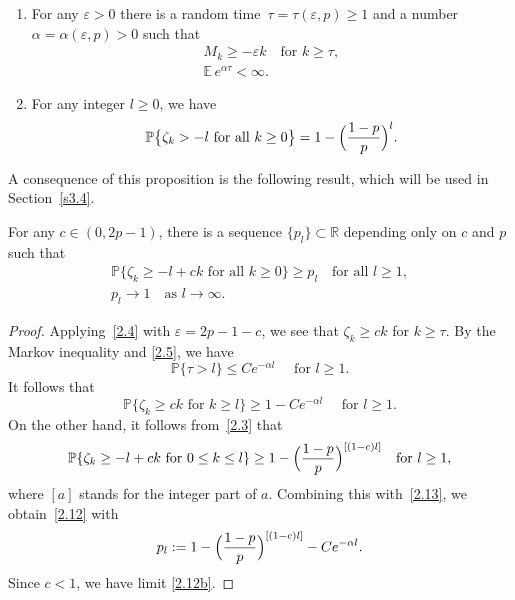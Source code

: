 \documentclass[JEP,XML,SOM,Unicode,ThmDefs]{cedram}
\newenvironment{enumeratea}
{\bgroup\def\theenumi{\alph{enumi}}\begin{enumerate}}
{\end{enumerate}\egroup}
\theoremstyle{plain}
\numberwithin{equation}{section}
\let\e\varepsilon
\let\ty\infty
\newcommand{\R}{{\mathbb R}}
\newcommand{\IP}{{\mathbb P}}
\newcommand{\E}{{\mathbb E}}
\begin{document}
\skpt
\begin{proposition} \label{p2.1}
\begin{enumeratea}
\item
For any $\e\!>\!0$ there is a random time~$\tau\!=\!\tau(\e,p)\!\ge\!1$ and a number \hbox{$\alpha\!=\!\alpha(\e,p)\!>\!0$} such that
\begin{gather}
M_k\ge -\e k\quad\text{for $k\ge\tau$},\label{2.4}\\
\E \,e^{\alpha\tau}<\infty. \label{2.5}
\end{gather}

\item
For any integer $l\ge0$, we have
\begin{equation}\label{2.3}
\IP\bigl\{\zeta_k> -l\text{ for all }k\ge0\bigr\}=1-\Bigl(\dfrac{1-p}{p}\Bigr)^l.
\end{equation}
\end{enumeratea}
\end{proposition}

A consequence of this proposition is the following result, which will be used in Section~\ref{s3.4}.

\begin{corollary} \label{c2.2}
For any $c\in(0,2p-1)$, there is a sequence $\{p_l\}\subset \R$ depending only on $c$ and $p$ such that
\begin{gather}
\IP\{\zeta_k\ge -l+ck\text{ for all $k\ge0$}\}\ge p_l \quad \text{for all $l\ge1$},\label{2.12}\\
p_l\to 1 \quad \text{as $l\to \ty$}. \label{2.12b}
\end{gather}
\end{corollary}
\begin{proof}
Applying~\eqref{2.4} with $\e=2p-1-c$, we see that $\zeta_k\ge ck$ for $k\ge \tau$.
By the Markov inequality and \eqref{2.5}, we have
\[
\IP\{\tau>l\}\le C e^{-\alpha l} \quad\text{ for $l\ge1$}.
\]
It follows that
\begin{equation} \label{2.13}
\IP\{\zeta_k\ge ck\text{ for $k\ge l$}\}\ge 1-C e^{-\alpha l}\quad\text{ for $l\ge1$}.
\end{equation}
On the other hand, it follows from~\eqref{2.3} that
\[
\IP\{\zeta_k\ge -l+ck\text{ for $0\le k\le l$}\}\ge1- \Bigl(\dfrac{1-p}{p}\Bigr)^{[(1-c)l]}
\quad \text{for $l\ge1$},
\]
where $[a]$ stands for the integer part of $a$. Combining this with~\eqref{2.13}, we obtain~\eqref{2.12} with
\[
p_l:=1- \Bigl(\dfrac{1-p}{p}\Bigr)^{[(1-c)l]} -C e^{-\alpha l}.
\]
Since $c<1$, we have limit \eqref{2.12b}.
\end{proof}
\end{document}
